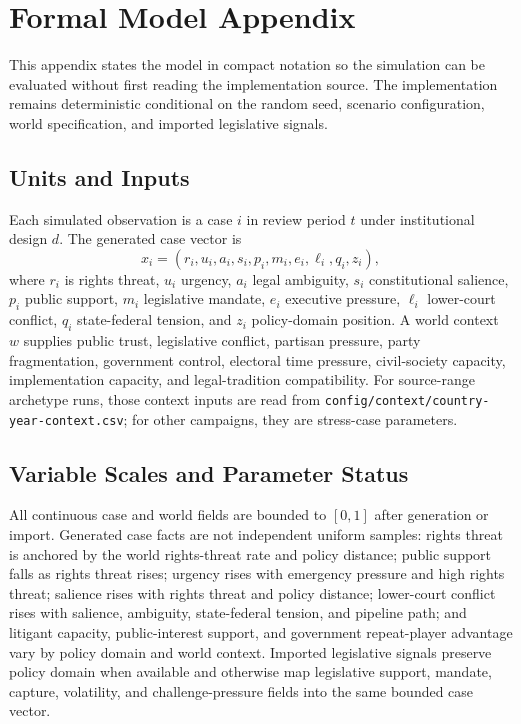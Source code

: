 \section*{Formal Model Appendix}

This appendix states the model in compact notation so the simulation can be evaluated without first reading the implementation source. The implementation remains deterministic conditional on the random seed, scenario configuration, world specification, and imported legislative signals.

\subsection*{Units and Inputs}

Each simulated observation is a case $i$ in review period $t$ under institutional design $d$. The generated case vector is
\[
x_i = (r_i, u_i, a_i, s_i, p_i, m_i, e_i, \ell_i, q_i, z_i),
\]
where $r_i$ is rights threat, $u_i$ urgency, $a_i$ legal ambiguity, $s_i$ constitutional salience, $p_i$ public support, $m_i$ legislative mandate, $e_i$ executive pressure, $\ell_i$ lower-court conflict, $q_i$ state-federal tension, and $z_i$ policy-domain position. A world context $w$ supplies public trust, legislative conflict, partisan pressure, party fragmentation, government control, electoral time pressure, civil-society capacity, implementation capacity, and legal-tradition compatibility. For source-range archetype runs, those context inputs are read from \texttt{config/context/country-year-context.csv}; for other campaigns, they are stress-case parameters.

\subsection*{Variable Scales and Parameter Status}

All continuous case and world fields are bounded to $[0,1]$ after generation or import. Generated case facts are not independent uniform samples: rights threat is anchored by the world rights-threat rate and policy distance; public support falls as rights threat rises; urgency rises with emergency pressure and high rights threat; salience rises with rights threat and policy distance; lower-court conflict rises with salience, ambiguity, state-federal tension, and pipeline path; and litigant capacity, public-interest support, and government repeat-player advantage vary by policy domain and world context. Imported legislative signals preserve policy domain when available and otherwise map legislative support, mandate, capture, volatility, and challenge-pressure fields into the same bounded case vector.

